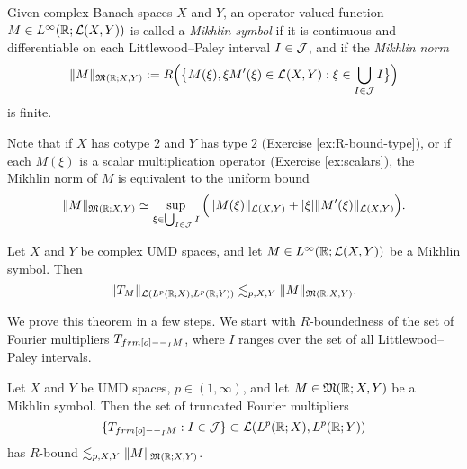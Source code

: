 \begin{defn}
  Given complex Banach spaces $X$ and $Y$, an operator-valued function $M \in L^\infty(\mathbb{R}; \mathcal{L}(X,Y))$ is called a \emph{Mikhlin symbol} if it is continuous and differentiable on each Littlewood--Paley interval $I \in \mathcal{J}$, and if the \emph{Mikhlin norm}
  \begin{equation*}
    \|M\|_{\mathfrak{M}(\mathbb{R};X,Y)} := R \Big( \big\{ M(\xi), \xi M'(\xi) \in \mathcal{L}(X,Y) : \xi \in \bigcup_{I \in \mathcal{J}} I \big\} \Big)
  \end{equation*}
  is finite.
\end{defn}

Note that if $X$ has cotype $2$ and $Y$ has type $2$ (Exercise \ref{ex:R-bound-type}), or if each $M(\xi)$ is a scalar multiplication operator (Exercise \ref{ex:scalars}), the Mikhlin norm of $M$ is equivalent to the uniform bound
\begin{equation*}
  \|M\|_{\mathfrak{M}(\mathbb{R};X,Y)} \simeq \sup_{\xi \in \bigcup_{I \in \mathcal{J}} I} \Big( \|M(\xi)\|_{\mathcal{L}(X,Y)} + |\xi|\|M'(\xi)\|_{\mathcal{L}(X,Y)} \Big).
\end{equation*}

\begin{thm}
  Let $X$ and $Y$ be complex UMD spaces, and let $M \in L^\infty(\mathbb{R};\mathcal{L}(X,Y))$ be a Mikhlin symbol.
  Then
  \begin{equation*}
    \|T_{M}\|_{\mathcal{L}(L^p(\mathbb{R};X), L^p(\mathbb{R};Y))} \lesssim_{p,X,Y} \|M\|_{\mathfrak{M}(\mathbb{R};X,Y)}.
  \end{equation*}
\end{thm}

We prove this theorem in a few steps.
We start with $R$-boundedness of the set of Fourier multipliers $T_{\1_{I} M}$, where $I$ ranges over the set of all Littlewood--Paley intervals.

\begin{lem}
  Let $X$ and $Y$ be UMD spaces, $p \in (1,\infty)$, and let $M \in \mathfrak{M}(\mathbb{R};X,Y)$ be a Mikhlin symbol.
  Then the set of truncated Fourier multipliers
  \begin{equation*}
    \{T_{\1_{I} M} : I \in \mc{J}\} \subset \Lin(L^p(\R;X), L^p(\R;Y))
  \end{equation*}
  has $R$-bound $\lesssim_{p,X,Y} \|M\|_{\mathfrak{M}(\mathbb{R};X,Y)}$.
\end{lem}


